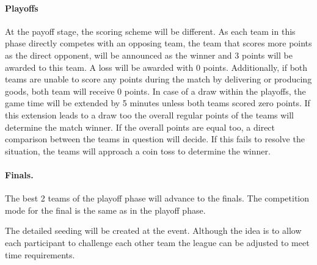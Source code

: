 \documentclass[12pt,twoside]{article}
\begin{document}
\paragraph{Playoffs} At the payoff stage, the scoring scheme will be
different. As each team in this phase directly competes with an
opposing team, the team that scores more points as the direct
opponent, will be announced as the winner and 3 points will be awarded
to this team. A loss will be awarded with 0 points. Additionally, if
both teams are unable to score any points during the match by
delivering or producing goods, both team will receive 0 points.
%
%
In case of a draw within the playoffs, the game time will be extended
by 5 minutes unless both teams scored zero points.
%
If this extension leads to a draw too the overall regular points of
the teams will determine the match winner. If the overall points are
equal too, a direct comparison between the teams in question will
decide. If this fails to resolve the situation, the teams will
approach a coin toss to determine the winner.



\paragraph{Finals.} The best 2 teams of the playoff phase will advance
to the finals. The competition mode for the final is the same as in
the playoff phase.

\bigskip
The detailed seeding will be created at the event. Although the idea
is to allow each participant to challenge each other team the league
can be adjusted to meet time requirements.
\end{document}
